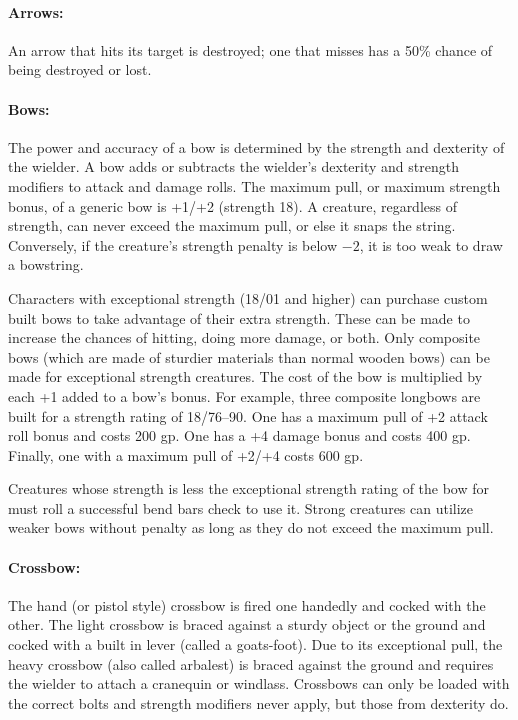 \begin{multicols}{2}
\paragraph{Arrows:} An arrow that hits its target is destroyed; one that misses has a 50\% chance of being destroyed or lost.

\paragraph{Bows:} The power and accuracy of a bow is determined by the strength and dexterity of the wielder.  A bow adds or subtracts the wielder's dexterity and strength modifiers to attack and damage rolls.  The maximum pull, or maximum strength bonus, of a generic bow is +1/+2 (strength 18).  A creature, regardless of strength, can never exceed the maximum pull, or else it snaps the string. Conversely, if the creature's strength penalty is below $-2$, it is too weak to draw a bowstring.

Characters with exceptional strength (18/01 and higher) can purchase custom built bows to take advantage of their extra strength. These can be made to increase the chances of hitting, doing more damage, or both.  Only composite bows (which are made of sturdier materials than normal wooden bows) can be made for exceptional strength creatures.  The cost of the bow is multiplied by each +1 added to a bow's bonus.  For example, three composite longbows are built for a strength rating of 18/76--90. One has a maximum pull of +2 attack roll bonus and costs 200 gp. One has a +4 damage bonus and costs 400 gp. Finally, one with a maximum pull of +2/+4 costs 600 gp.

Creatures whose strength is less the exceptional strength rating of the bow for must roll a successful bend bars check to use it.  Strong creatures can utilize weaker bows without penalty as long as they do not exceed the maximum pull.  

\paragraph{Crossbow:} The hand (or pistol style) crossbow is fired one handedly and cocked with the other.  The light crossbow is braced against a sturdy object or the ground and cocked with a built in lever (called a goats-foot).  Due to its exceptional pull, the heavy crossbow (also called arbalest) is braced against the ground and requires the wielder to attach a cranequin or windlass.  Crossbows can only be loaded with the correct bolts and strength modifiers never apply, but those from dexterity do.


\end{multicols}
